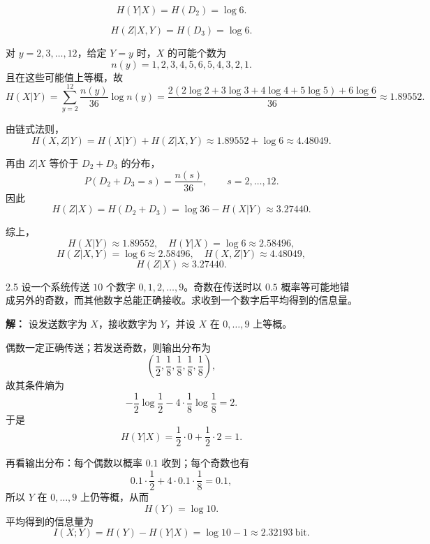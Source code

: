 \documentclass[UTF8,11pt,a4paper]{ctexart}
\begin{document}
\[
H(Y|X)=H(D_2)=\log 6.
\]

\[
H(Z|X,Y)=H(D_3)=\log 6.
\]

对 $y=2,3,\dots,12$，给定 $Y=y$ 时，$X$ 的可能个数为
\[
n(y)=1,2,3,4,5,6,5,4,3,2,1.
\]
且在这些可能值上等概，故
\[
H(X|Y)=\sum_{y=2}^{12}\frac{n(y)}{36}\log n(y)
=\frac{2(2\log 2+3\log 3+4\log 4+5\log 5)+6\log 6}{36}
\approx 1.89552.
\]

由链式法则，
\[
H(X,Z|Y)=H(X|Y)+H(Z|X,Y)\approx 1.89552+\log 6\approx 4.48049.
\]

再由 $Z|X$ 等价于 $D_2+D_3$ 的分布，
\[
P(D_2+D_3=s)=\frac{n(s)}{36},\qquad s=2,\dots,12.
\]
因此
\[
H(Z|X)=H(D_2+D_3)=\log 36-H(X|Y)\approx 3.27440.
\]

综上，
\[
H(X|Y)\approx 1.89552,\quad H(Y|X)=\log 6\approx 2.58496,
\]
\[
H(Z|X,Y)=\log 6\approx 2.58496,\quad H(X,Z|Y)\approx 4.48049,
\]
\[
H(Z|X)\approx 3.27440.
\]
\vspace{0.8em}

\begin{problem}{2.5}
设一个系统传送 $10$ 个数字 $0,1,2,\dots,9$。奇数在传送时以 $0.5$ 概率等可能地错成另外的奇数，而其他数字总能正确接收。求收到一个数字后平均得到的信息量。
\end{problem}
\noindent\textbf{解：}
设发送数字为 $X$，接收数字为 $Y$，并设 $X$ 在 $0,\dots,9$ 上等概。

偶数一定正确传送；若发送奇数，则输出分布为
\[
\left(\frac12,\frac18,\frac18,\frac18,\frac18\right),
\]
故其条件熵为
\[
-\frac12\log\frac12-4\cdot\frac18\log\frac18=2.
\]
于是
\[
H(Y|X)=\frac12\cdot 0+\frac12\cdot 2=1.
\]

再看输出分布：每个偶数以概率 $0.1$ 收到；每个奇数也有
\[
0.1\cdot \frac12+4\cdot 0.1\cdot \frac18=0.1,
\]
所以 $Y$ 在 $0,\dots,9$ 上仍等概，从而
\[
H(Y)=\log 10.
\]
平均得到的信息量为
\[
I(X;Y)=H(Y)-H(Y|X)=\log 10-1\approx 2.32193\ \text{bit}.
\]
\vspace{0.8em}
\end{document}
